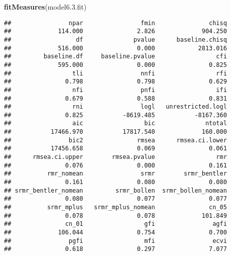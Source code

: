 \documentclass[english,man]{apa6}
\newenvironment{Shaded}{\begin{snugshade}}{\end{snugshade}}
\newcommand{\KeywordTok}[1]{\textcolor[rgb]{0.13,0.29,0.53}{\textbf{#1}}}
\newcommand{\FloatTok}[1]{\textcolor[rgb]{0.00,0.00,0.81}{#1}}
\newcommand{\NormalTok}[1]{#1}
\theoremstyle{definition}
\theoremstyle{definition}
\theoremstyle{definition}
\theoremstyle{remark}
\begin{document}
\begin{Shaded}
\begin{Highlighting}[]
\KeywordTok{fitMeasures}\NormalTok{(model6.}\FloatTok{3.}\NormalTok{fit)}
\end{Highlighting}
\end{Shaded}

\begin{verbatim}
##                npar                fmin               chisq 
##             114.000               2.826             904.250 
##                  df              pvalue      baseline.chisq 
##             516.000               0.000            2813.016 
##         baseline.df     baseline.pvalue                 cfi 
##             595.000               0.000               0.825 
##                 tli                nnfi                 rfi 
##               0.798               0.798               0.629 
##                 nfi                pnfi                 ifi 
##               0.679               0.588               0.831 
##                 rni                logl   unrestricted.logl 
##               0.825           -8619.485           -8167.360 
##                 aic                 bic              ntotal 
##           17466.970           17817.540             160.000 
##                bic2               rmsea      rmsea.ci.lower 
##           17456.658               0.069               0.061 
##      rmsea.ci.upper        rmsea.pvalue                 rmr 
##               0.076               0.000               0.161 
##          rmr_nomean                srmr        srmr_bentler 
##               0.161               0.080               0.080 
## srmr_bentler_nomean         srmr_bollen  srmr_bollen_nomean 
##               0.080               0.077               0.077 
##          srmr_mplus   srmr_mplus_nomean               cn_05 
##               0.078               0.078             101.849 
##               cn_01                 gfi                agfi 
##             106.044               0.754               0.700 
##                pgfi                 mfi                ecvi 
##               0.618               0.297               7.077
\end{verbatim}
\end{document}
